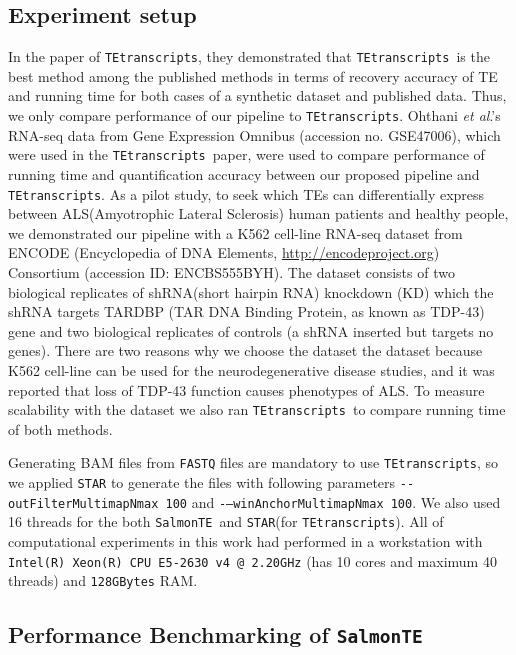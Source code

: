 \documentclass{ws-procs11x85}
\newcommand{\etal}{\textit{et al}.}
\newcommand{\TEtranscripts}{\texttt{TEtranscripts}}
\newcommand{\SalmonTE}{\texttt{SalmonTE}}
\begin{document}
\subsection{Experiment setup}
In the paper of \TEtranscripts, they demonstrated that \TEtranscripts~is the best method among the published methods in terms of recovery accuracy of TE and running time for both cases of a synthetic dataset and published data. 
Thus, we only compare performance of our pipeline to \TEtranscripts. 
Ohthani \etal's RNA-seq data from Gene Expression Omnibus (accession no. GSE47006), which were used in the \TEtranscripts~paper, 
were used to compare performance of running time and quantification accuracy between
our proposed pipeline and \TEtranscripts. \cite{ohtani2013dmgtsf1}
As a pilot study, to seek which TEs can differentially express between ALS(Amyotrophic Lateral Sclerosis) human patients and healthy people, 
we demonstrated our pipeline with a K562 cell-line RNA-seq dataset from ENCODE (Encyclopedia of DNA Elements, \url{http://encodeproject.org}) \cite{encode2012integrated} Consortium (accession ID: ENCBS555BYH). 
The dataset consists of two biological replicates of shRNA(short hairpin RNA) knockdown (KD)
which the shRNA targets TARDBP (TAR DNA Binding Protein, as known as TDP-43) gene and two biological replicates of controls 
(a shRNA inserted but targets no genes). 
There are two reasons why we choose the dataset
the dataset because K562 cell-line can be used for the neurodegenerative 
disease studies,\cite{haney2017crispr}
and it was reported that loss of TDP-43 function causes phenotypes of 
ALS.\cite{yang2014partial,mihevc2016tdp} To measure scalability with the dataset
we also ran \TEtranscripts~to compare running time of both methods.


Generating BAM files from \verb|FASTQ| files are mandatory to use \TEtranscripts, so we applied \verb|STAR|\cite{dobin2013star} to generate the files with following parameters
\verb|--outFilterMultimapNmax 100| and \verb|-–winAnchorMultimapNmax 100|. We also used 16 threads for the both \SalmonTE~and \verb|STAR|(for \TEtranscripts).
All of computational experiments in this work had performed in a workstation with 
\verb|Intel(R) Xeon(R) CPU E5-2630 v4 @ 2.20GHz| (has 10 cores and maximum 40 threads) and \verb|128GBytes| RAM.


\subsection{Performance Benchmarking of \SalmonTE}
\end{document}
